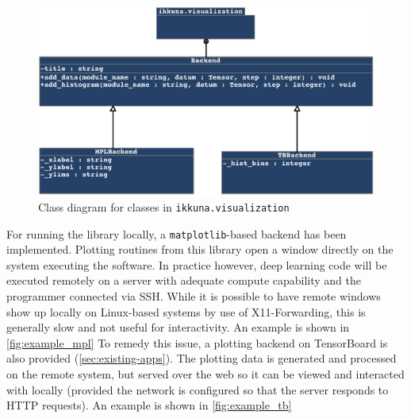 \begin{figure}
    \hypertarget{fig:class-diag-backend}{%
        \centering
        \includegraphics[max width=\textwidth]{gfx/diagrams/class_diagrams/visualization_class_diagram.pdf}
        \caption{Class diagram for classes in \texttt{ikkuna.visualization}}\label{fig:class-diag-backend}
    }
\end{figure}

For running the library locally, a \texttt{matplotlib}-based backend has been
implemented.  Plotting routines from this library open a window directly on the
system executing the software. In practice however, deep learning code will be
executed remotely on a server with adequate compute capability and the
programmer connected via SSH. While it is possible to have remote windows show
up locally on Linux-based systems by use of X11-Forwarding, this is generally
slow and not useful for interactivity. An example is shown in
\cref{fig:example_mpl} To remedy this issue, a plotting backend on TensorBoard
is also provided (\cref{sec:existing-apps}). The plotting data is generated and
processed on the remote system, but served over the web so it can be viewed and
interacted with locally (provided the network is configured so that the server
responds to HTTP requests). An example is shown in \cref{fig:example_tb}

